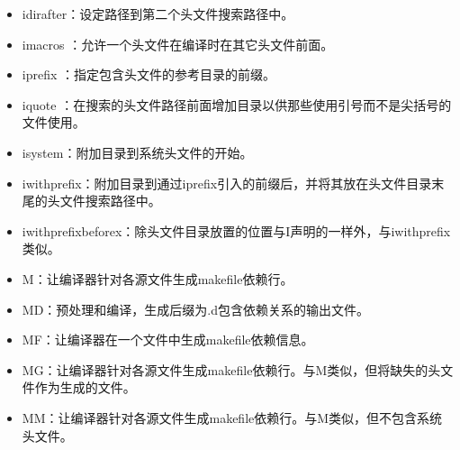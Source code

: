 \documentclass[a4paper,12pt,english]{sphinxmanual}
\begin{document}
\begin{itemize}
\item {} 
\sphinxAtStartPar
\sphinxhyphen{}idirafter：设定路径到第二个头文件搜索路径中。

\item {} 
\sphinxAtStartPar
\sphinxhyphen{}imacros ：允许一个头文件在编译时在其它头文件前面。

\item {} 
\sphinxAtStartPar
\sphinxhyphen{}iprefix ：指定包含头文件的参考目录的前缀。

\item {} 
\sphinxAtStartPar
\sphinxhyphen{}iquote ：在搜索的头文件路径前面增加目录以供那些使用引号而不是尖括号的文件使用。

\item {} 
\sphinxAtStartPar
\sphinxhyphen{}isystem：附加目录到系统头文件的开始。

\item {} 
\sphinxAtStartPar
\sphinxhyphen{}iwithprefix：附加目录到通过\sphinxhyphen{}iprefix引入的前缀后，并将其放在头文件目录末尾的头文件搜索路径中。

\item {} 
\sphinxAtStartPar
\sphinxhyphen{}iwithprefixbeforex：除头文件目录放置的位置与\sphinxhyphen{}I声明的一样外，与\sphinxhyphen{}iwithprefix类似。

\item {} 
\sphinxAtStartPar
\sphinxhyphen{}M：让编译器针对各源文件生成makefile依赖行。

\item {} 
\sphinxAtStartPar
\sphinxhyphen{}MD：预处理和编译，生成后缀为.d包含依赖关系的输出文件。

\item {} 
\sphinxAtStartPar
\sphinxhyphen{}MF：让编译器在一个文件中生成makefile依赖信息。

\item {} 
\sphinxAtStartPar
\sphinxhyphen{}MG：让编译器针对各源文件生成makefile依赖行。与\sphinxhyphen{}M类似，但将缺失的头文件作为生成的文件。

\item {} 
\sphinxAtStartPar
\sphinxhyphen{}MM：让编译器针对各源文件生成makefile依赖行。与\sphinxhyphen{}M类似，但不包含系统头文件。


\end{itemize}
\end{document}
